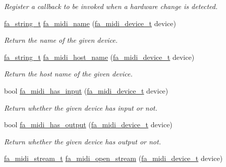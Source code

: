 \begin{DoxyCompactItemize}
\begin{DoxyCompactList}\small\item\em Register a callback to be invoked when a hardware change is detected. \end{DoxyCompactList}\item 
\hyperlink{group___fa_string_gacada63033b77bc6c39fa632ae199349b}{fa\-\_\-string\-\_\-t} \hyperlink{group___fa_midi_ga4ed5065817addf704612c41e2e6ec753}{fa\-\_\-midi\-\_\-name} (\hyperlink{group___fa_midi_gabbbfd1ec30a186768ba2744e46bacc9b}{fa\-\_\-midi\-\_\-device\-\_\-t} device)
\begin{DoxyCompactList}\small\item\em Return the name of the given device. \end{DoxyCompactList}\item 
\hyperlink{group___fa_string_gacada63033b77bc6c39fa632ae199349b}{fa\-\_\-string\-\_\-t} \hyperlink{group___fa_midi_ga370b7d98e395878426f1c91104e40489}{fa\-\_\-midi\-\_\-host\-\_\-name} (\hyperlink{group___fa_midi_gabbbfd1ec30a186768ba2744e46bacc9b}{fa\-\_\-midi\-\_\-device\-\_\-t} device)
\begin{DoxyCompactList}\small\item\em Return the host name of the given device. \end{DoxyCompactList}\item 
bool \hyperlink{group___fa_midi_ga50b48cf8b0f607418a9c9720b3f1f50e}{fa\-\_\-midi\-\_\-has\-\_\-input} (\hyperlink{group___fa_midi_gabbbfd1ec30a186768ba2744e46bacc9b}{fa\-\_\-midi\-\_\-device\-\_\-t} device)
\begin{DoxyCompactList}\small\item\em Return whether the given device has input or not. \end{DoxyCompactList}\item 
bool \hyperlink{group___fa_midi_gaa86f40de5a25870a92e962e45dcb43a6}{fa\-\_\-midi\-\_\-has\-\_\-output} (\hyperlink{group___fa_midi_gabbbfd1ec30a186768ba2744e46bacc9b}{fa\-\_\-midi\-\_\-device\-\_\-t} device)
\begin{DoxyCompactList}\small\item\em Return whether the given device has output or not. \end{DoxyCompactList}\item 
\hyperlink{group___fa_midi_ga85772039b62d8bb718a51e1ffbbb2fa2}{fa\-\_\-midi\-\_\-stream\-\_\-t} \hyperlink{group___fa_midi_gab7b05f67b7966c706652a292bb9e7a65}{fa\-\_\-midi\-\_\-open\-\_\-stream} (\hyperlink{group___fa_midi_gabbbfd1ec30a186768ba2744e46bacc9b}{fa\-\_\-midi\-\_\-device\-\_\-t} device)

\end{DoxyCompactItemize}

